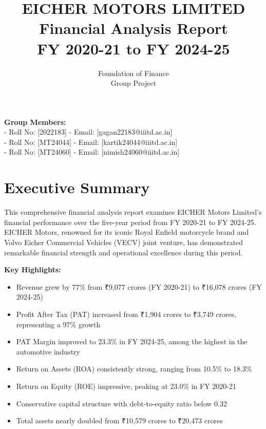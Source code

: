 \documentclass[8pt,a4paper]{article}
\title{\textbf{EICHER MOTORS LIMITED}\\
\textbf{Financial Analysis Report} \\
FY 2020-21 to FY 2024-25}
\author{Foundation of Finance\\
Group Project}
\begin{document}
\maketitle

\vspace{2cm}

\begin{center}
\textbf{Group Members:}\\
[Gagan Raj Singh] - Roll No: [2022183] - Email: [gagan22183@iiitd.ac.in]\\
[Kartik Gupta] - Roll No: [MT24044] - Email: [kartik24044@iiitd.ac.in]\\
[Nimish Goyal] - Roll No: [MT24060] - Email: [nimish24060@iiitd.ac.in]
\end{center}

\newpage

\tableofcontents
\listoftables
\listoffigures

\newpage

\section{Executive Summary}

This comprehensive financial analysis report examines EICHER Motors Limited's financial performance over the five-year period from FY 2020-21 to FY 2024-25. EICHER Motors, renowned for its iconic Royal Enfield motorcycle brand and Volvo Eicher Commercial Vehicles (VECV) joint venture, has demonstrated remarkable financial strength and operational excellence during this period.

\textbf{Key Highlights:}
\begin{itemize}
    \item Revenue grew by 77\% from ₹9,077 crores (FY 2020-21) to ₹16,078 crores (FY 2024-25)
    \item Profit After Tax (PAT) increased from ₹1,904 crores to ₹3,749 crores, representing a 97\% growth
    \item PAT Margin improved to 23.3\% in FY 2024-25, among the highest in the automotive industry
    \item Return on Assets (ROA) consistently strong, ranging from 10.5\% to 18.3\%
    \item Return on Equity (ROE) impressive, peaking at 23.0\% in FY 2020-21
    \item Conservative capital structure with debt-to-equity ratio below 0.32
    \item Total assets nearly doubled from ₹10,579 crores to ₹20,473 crores
\end{itemize}
\end{document}
